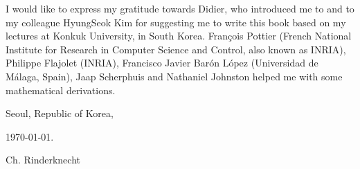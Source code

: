 I would like to express my gratitude towards Didier, who introduced me
to \Erlang and to my colleague HyungSeok Kim for suggesting me to
write this book based on my lectures at Konkuk University, in South
Korea. Fran\c{c}ois Pottier (French National Institute for Research in
Computer Science and Control, also known as INRIA), Philippe Flajolet
(INRIA), Francisco Javier Bar\'on L\'opez (Universidad de M\'alaga,
Spain), Jaap Scherphuis and Nathaniel Johnston helped me with some
mathematical derivations.

\bigskip

\hfill Seoul, Republic of Korea,

\hfill\today.

\hfill Ch. Rinderknecht

